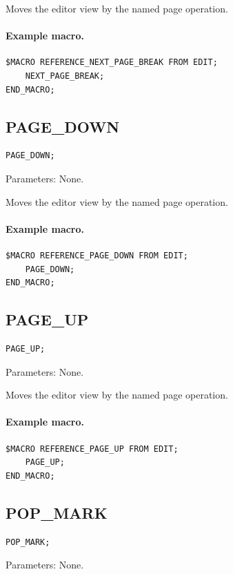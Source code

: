 \documentclass[a4paper,10pt,twoside,openany]{book}
\begin{document}
Moves the editor view by the named page operation.

\paragraph{Example macro.}
\begin{verbatim}
$MACRO REFERENCE_NEXT_PAGE_BREAK FROM EDIT;
    NEXT_PAGE_BREAK;
END_MACRO;
\end{verbatim}

\label{prim:procedure-page-down}
\subsection*{PAGE\_DOWN}
\begin{verbatim}
PAGE_DOWN;
\end{verbatim}
Parameters: None.

Moves the editor view by the named page operation.

\paragraph{Example macro.}
\begin{verbatim}
$MACRO REFERENCE_PAGE_DOWN FROM EDIT;
    PAGE_DOWN;
END_MACRO;
\end{verbatim}

\label{prim:procedure-page-up}
\subsection*{PAGE\_UP}
\begin{verbatim}
PAGE_UP;
\end{verbatim}
Parameters: None.

Moves the editor view by the named page operation.

\paragraph{Example macro.}
\begin{verbatim}
$MACRO REFERENCE_PAGE_UP FROM EDIT;
    PAGE_UP;
END_MACRO;
\end{verbatim}

\label{prim:procedure-pop-mark}
\subsection*{POP\_MARK}
\begin{verbatim}
POP_MARK;
\end{verbatim}
Parameters: None.
\end{document}

